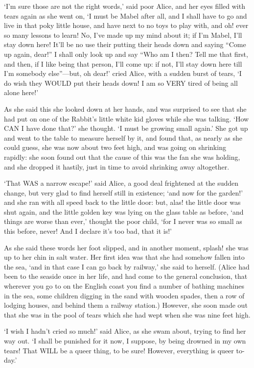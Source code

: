 \documentclass[12pt]{book}
\begin{document}
\begin{Parallel}[p]{}{}
{‘I’m sure those are not the right words,’ said poor Alice, and her eyes filled with tears again as she went on, ‘I must be Mabel after all, and I shall have to go and live in that poky little house, and have next to no toys to play with, and oh! ever so many lessons to learn! No, I’ve made up my mind about it; if I’m Mabel, I’ll stay down here! It’ll be no use their putting their heads down and saying “Come up again, dear!” I shall only look up and say “Who am I then? Tell me that first, and then, if I like being that person, I’ll come up: if not, I’ll stay down here till I’m somebody else”—but, oh dear!’ cried Alice, with a sudden burst of tears, ‘I do wish they WOULD put their heads down! I am so VERY tired of being all alone here!’

As she said this she looked down at her hands, and was surprised to see that she had put on one of the Rabbit’s little white kid gloves while she was talking. ‘How CAN I have done that?’ she thought. ‘I must be growing small again.’ She got up and went to the table to measure herself by it, and found that, as nearly as she could guess, she was now about two feet high, and was going on shrinking rapidly: she soon found out that the cause of this was the fan she was holding, and she dropped it hastily, just in time to avoid shrinking away altogether.

‘That WAS a narrow escape!’ said Alice, a good deal frightened at the sudden change, but very glad to find herself still in existence; ‘and now for the garden!’ and she ran with all speed back to the little door: but, alas! the little door was shut again, and the little golden key was lying on the glass table as before, ‘and things are worse than ever,’ thought the poor child, ‘for I never was so small as this before, never! And I declare it’s too bad, that it is!’

As she said these words her foot slipped, and in another moment, splash! she was up to her chin in salt water. Her first idea was that she had somehow fallen into the sea, ‘and in that case I can go back by railway,’ she said to herself. (Alice had been to the seaside once in her life, and had come to the general conclusion, that wherever you go to on the English coast you find a number of bathing machines in the sea, some children digging in the sand with wooden spades, then a row of lodging houses, and behind them a railway station.) However, she soon made out that she was in the pool of tears which she had wept when she was nine feet high.

‘I wish I hadn’t cried so much!’ said Alice, as she swam about, trying to find her way out. ‘I shall be punished for it now, I suppose, by being drowned in my own tears! That WILL be a queer thing, to be sure! However, everything is queer to-day.’

}
\end{Parallel}
\end{document}
